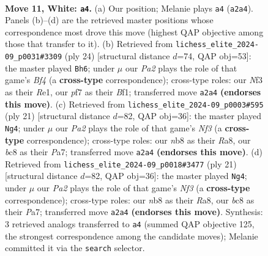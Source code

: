 \documentclass[11pt]{article}
\begin{document}
\clearpage

\begin{figure}[p]\centering
\begin{subfigure}{0.46\textwidth}\centering
\resizebox{\linewidth}{!}{%
\newchessgame
\chessboard[
  setfen={rnbq1rk1/pp3pbp/1n2p1p1/3p4/3P4/1B1Q1N2/PPP2PPP/RNB1R1K1 w - - 0 11},
  showmover=false,
  pgfstyle=straightmove, color=movearrow, markmove={a2-a4}
]}
\caption{}
\end{subfigure}\hfill
\begin{subfigure}{0.46\textwidth}\centering
\resizebox{\linewidth}{!}{%
\newchessgame
\chessboard[
  setfen={r1bqnrk1/pp2bp1p/1np3p1/3pP3/3N1B2/2N2Q2/PPP2PPP/R3RBK1 w - - 0 13},
  showmover=false,
  pgfstyle=straightmove, color=movearrow, markmove={f4-h6}
]}
\caption{}
\end{subfigure}
\\[4pt]
\begin{subfigure}{0.46\textwidth}\centering
\resizebox{\linewidth}{!}{%
\newchessgame
\chessboard[
  setfen={r1br2k1/ppq1bppp/2n1pn2/2P5/2N5/1Q2B1P1/PP2PPBP/RN3RK1 b - - 4 11},
  showmover=false,
  pgfstyle=straightmove, color=movearrow, markmove={f6-g4}
]}
\caption{}
\end{subfigure}\hfill
\begin{subfigure}{0.46\textwidth}\centering
\resizebox{\linewidth}{!}{%
\newchessgame
\chessboard[
  setfen={r1br2k1/ppq1bppp/2n1pn2/2P5/2N5/1Q2B1P1/PP2PPBP/RN3RK1 b - - 4 11},
  showmover=false,
  pgfstyle=straightmove, color=movearrow, markmove={f6-g4}
]}
\caption{}
\end{subfigure}
\caption{\textbf{Move 11, White: \texttt{a4}.} (a) Our position; Melanie plays \texttt{a4} (\texttt{a2a4}). Panels (b)--(d) are the retrieved master positions whose correspondence most drove this move (highest QAP objective among those that transfer to it). (b) Retrieved from \texttt{lichess\_elite\_2024-09\_p0031\#3309} (ply 24) [structural distance $d$=74, QAP obj=53]: the master played \texttt{Bh6}; under $\mu$ our \emph{Pa2} plays the role of that game's \emph{Bf4} (a \textbf{cross-type} correspondence); cross-type roles: our \emph{N}f3 as their \emph{R}e1, our \emph{p}f7 as their \emph{B}f1; transferred move \texttt{a2a4} \textbf{(endorses this move)}. (c) Retrieved from \texttt{lichess\_elite\_2024-09\_p0003\#595} (ply 21) [structural distance $d$=82, QAP obj=36]: the master played \texttt{Ng4}; under $\mu$ our \emph{Pa2} plays the role of that game's \emph{Nf3} (a \textbf{cross-type} correspondence); cross-type roles: our \emph{n}b8 as their \emph{R}a8, our \emph{b}c8 as their \emph{P}a7; transferred move \texttt{a2a4} \textbf{(endorses this move)}. (d) Retrieved from \texttt{lichess\_elite\_2024-09\_p0018\#3477} (ply 21) [structural distance $d$=82, QAP obj=36]: the master played \texttt{Ng4}; under $\mu$ our \emph{Pa2} plays the role of that game's \emph{Nf3} (a \textbf{cross-type} correspondence); cross-type roles: our \emph{n}b8 as their \emph{R}a8, our \emph{b}c8 as their \emph{P}a7; transferred move \texttt{a2a4} \textbf{(endorses this move)}. Synthesis: 3 retrieved analogs transferred to \texttt{a4} (summed QAP objective 125, the strongest correspondence among the candidate moves); Melanie committed it via the \texttt{search} selector.}

\end{figure}
\end{document}
